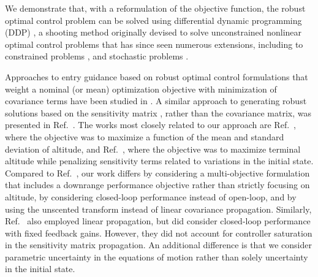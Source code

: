 \documentclass[journal ]{new-aiaa}
\begin{document}
We demonstrate that, with a reformulation of the objective function, the robust optimal control problem can be solved using differential dynamic programming (DDP) \cite{DDP}, a shooting method originally devised to solve unconstrained nonlinear optimal control problems that has since seen numerous extensions, including to constrained problems \cite{DDP_ControlLimited,HDDP1,HDDP2,DDP_NonlinearConstraints,DDP_InteriorPoint}, and stochastic problems \cite{iLQG, DDP_Stochastic, ozaki_UT,ozaki2020tube}. 


Approaches to entry guidance based on robust optimal control formulations that weight a nominal (or mean) optimization objective with minimization of covariance terms have been studied in \cite{AltitudeUnderUncertainty, EntryOUUThesis1, EntryOUUThesis2, EntryOUU}. A similar approach to generating robust solutions based on the sensitivity matrix \cite{Desensitized}, rather than the covariance matrix, was presented in Ref.~\cite{MarsEntryDesensitized}. 
The works most closely related to our approach are Ref.~\cite{AltitudeUnderUncertainty}, where the objective was to maximize a function of the mean and standard deviation of altitude, and Ref.~\cite{MarsEntryDesensitized}, where the objective was to maximize terminal altitude while penalizing sensitivity terms related to variations in the initial state. Compared to Ref.~\cite{AltitudeUnderUncertainty}, our work differs by considering a multi-objective formulation that includes a downrange performance objective rather than strictly focusing on altitude, by considering closed-loop performance instead of open-loop, and by using the unscented transform instead of linear covariance propagation. Similarly, Ref.~\cite{MarsEntryDesensitized} also employed linear propagation, but did consider closed-loop performance with fixed feedback gains. However, they did not account for controller saturation in the sensitivity matrix propagation. An additional difference is that we consider parametric uncertainty in the equations of motion rather than solely uncertainty in the initial state. 
\end{document}
